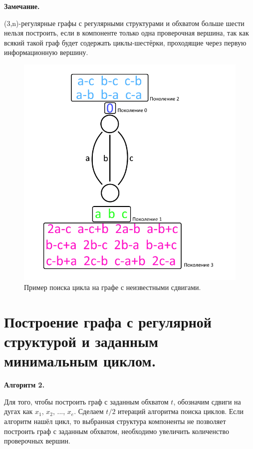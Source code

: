 \documentclass[14pt]{mmcs_article}
\begin{document}
\textbf{Замечание.}

(3,n)-регулярные графы с регулярными структурами и обхватом больше шести нельзя построить, если в компоненте только одна проверочная вершина, так как всякий такой граф будет содержать циклы-шестёрки, проходящие через первую информационную вершину.
 
\begin{figure}[H]
  \centering
  \includegraphics[scale=0.6]{Fig_5.png}
  \caption{ Пример поиска цикла на графе с неизвестными сдвигами. }
  \label{stud:fig:5}
\end{figure}
   
\newpage
{}
\section*{Построение графа с регулярной структурой и заданным минимальным циклом.}

\textbf{Алгоритм 2.}

Для того, чтобы построить граф с заданным обхватом $t$, обозначим сдвиги на дугах как $x_1$, $x_2$, ..., $x_e$. Сделаем $t/2$ итераций алгоритма поиска циклов. Если алгоритм нашёл цикл, то выбранная структура компоненты не позволяет построить граф с заданным обхватом, необходимо увеличить количенство проверочных вершин.
\end{document}
